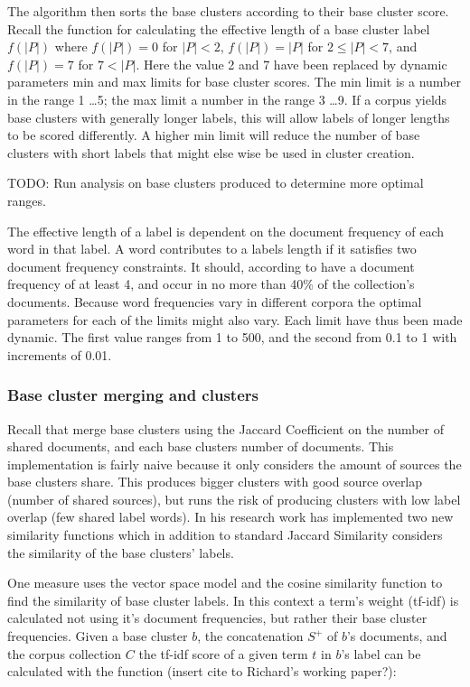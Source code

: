 The algorithm then sorts the base clusters according to their base cluster score. Recall the function for calculating the effective length of a base cluster label \(f(\vert P \vert)\) where \(f(\vert P \vert) = 0\) for \(\vert P \vert < 2\), \(f(\vert P \vert) = \vert P \vert\) for \(2 \le \vert P \vert < 7\), and \(f(\vert P \vert) = 7\) for \(7 < \vert P \vert\). Here the value 2 and 7 have been replaced by dynamic parameters min and max limits for base cluster scores. The min limit is a number in the range 1 \dots 5; the max limit a number in the range 3 \dots 9. If a corpus yields base clusters with generally longer labels, this will allow labels of longer lengths to be scored differently. A higher min limit will reduce the number of base clusters with short labels that might else wise be used in cluster creation.

TODO: Run analysis on base clusters produced to determine more optimal ranges.

The effective length of a label is dependent on the document frequency of each word in that label. A word contributes to a labels length if it satisfies two document frequency constraints. It should, according to \cite{Oren1998} have a document frequency of at least 4, and occur in no more than 40\% of the collection's documents. Because word frequencies vary in different corpora the optimal parameters for each of the limits might also vary. Each limit have thus been made dynamic. The first value ranges from 1 to 500, and the second from 0.1 to 1 with increments of 0.01.

\subsubsection{Base cluster merging and clusters}
Recall that \cite{Oren1998} merge base clusters using the Jaccard Coefficient on the number of shared documents, and each base clusters number of documents. This implementation is fairly naive because it only considers the amount of sources the base clusters share. This produces bigger clusters with good source overlap (number of shared sources), but runs the risk of producing clusters with low label overlap (few shared label words). In his research work \supervisor has implemented two new similarity functions which in addition to standard Jaccard Similarity considers the similarity of the base clusters' labels. 

One measure uses the vector space model and the cosine similarity function to find the similarity of base cluster labels. In this context a term's weight (tf-idf) is calculated not using it's document frequencies, but rather their base cluster frequencies. Given a base cluster \(b\), the concatenation \(S^+\) of \(b\)'s documents, and the corpus collection \(C\) the tf-idf score of a given term \(t\) in \(b\)'s label can be calculated with the function (insert cite to Richard's working paper?):

